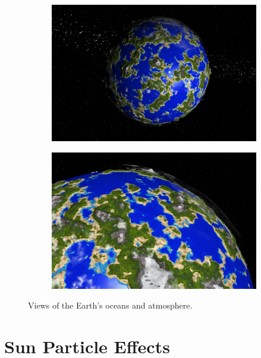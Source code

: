 \documentclass[paper=a4, fontsize=11pt]{scrartcl} %
\numberwithin{equation}{section} %
\numberwithin{figure}{section} %
\numberwithin{table}{section} %
\theoremstyle{definition}
\begin{document}
\begin{figure}
	\centering
	\begin{subfigure}{.48\textwidth}
		\centering
		\includegraphics[width=1.0\linewidth]{images/earth1.png}
	\end{subfigure}
	\begin{subfigure}{.48\textwidth}
		\centering
		\includegraphics[width=1.0\linewidth]{images/earth2.png}
	\end{subfigure}
	\caption{Views of the Earth's oceans and atmosphere.}
	\label{fig:menu}
\end{figure}


\section{Sun Particle Effects}
\end{document}
